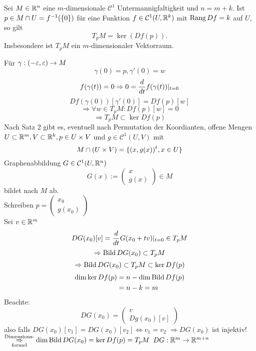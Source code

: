 \documentclass[../ana2.tex]{subfiles}
\begin{document}
\begin{lem}
    Sei \( M \in \mathbb{R}^n \) eine \(m\)-dimensionale 
    \( \mathcal{C}^1 \) Untermannigfaltigkeit  und \(n = m + k\).
    Ist \( p \in M \cap U = f^{-1}(\{0\}) \) für eine
    Funktion \( f \in \mathcal{C}^1(U, \mathbb{R}^k) \) mit 
    \( \operatorname{Rang} Df = k \) auf \(U\),
    so gilt 
    \[ T_p M = \ker(Df(p)). \]
    Insbesondere ist \( T_p M \) ein \(m\)-dimensionaler 
    Vektorraum.
\end{lem}
\begin{bew}
    Für \(\gamma:(-\varepsilon, \varepsilon)\rightarrow M\)
    \[ \gamma(0) = p, \gamma'(0) = w \]
    \[ f(\gamma(t)) = 0 \Rightarrow 0 = \frac{d}{dt}f(\gamma(t))\vert_{t=0} \]
    \[ Df(\gamma(0))[\gamma'(0)] = Df(p)[w] \]
    \[ \Rightarrow \forall w \in T_p M: Df(p)[w] = 0 \]
    \[ \Rightarrow T_pM \subset \ker Df(p) \]
    Nach Satz 2 gibt es, eventuell nach Permutation der Koordianten, offene Mengen
    \(U \subset \mathbb{R}^m, V \subset \mathbb{R}^k, p \in U \times V\) und
    \(g \in \mathcal{C}^1(U, V) \) mit
    \[ M \cap (U \times V) = \{(x, g(x))^t, x \in U\} \]
    Graphenabbildung \( G \in \mathcal{C}^1(U, \mathbb{R}^n) \)
    \[ G(x) := \begin{pmatrix}
        x \\ g(x) 
    \end{pmatrix} \in M \]
    bildet nach \(M\) ab.\\
    Schreiben \(p = \begin{pmatrix}
        x_0 \\
        g(x_0)
    \end{pmatrix} \)\\
    Sei \(v \in \mathbb{R}^m\)
    \[ DG(x_0)[v] = \frac{d}{dt} G(x_0+tv) \vert_{t=0} \in T_pM \]
    \[ \Rightarrow \operatorname{Bild} DG(x_0) \subset T_p M\]
    \[ \Rightarrow \operatorname{Bild} DG(x_0) \subset T_pM \subset \ker Df(p) \]
    \begin{align*}
        \dim \ker Df(p) &= n - \dim \operatorname{Bild} Df(p) \\
        &= n -k = m
    \end{align*}
    Beachte: 
    \[DG(x_0) = \begin{pmatrix}
        v \\
        D g(x_0)[v]
    \end{pmatrix}  \]
    also falls \( DG(x_0)[v_1] 
    = D G(x_0)[v_2] \Leftrightarrow v_1 = v_2 \)
    \(\Rightarrow D G(x_0) \) ist injektiv!
    \(\overset{\text{Dimensions-}}{\underset{\text{formel}}{\Rightarrow}} 
    \dim \operatorname{Bild} DG(x_0) = \ker Df(p) = T_pM\)
    \( DG:\mathbb{R}^m\rightarrow \mathbb{R}^{m+n} \)
\end{bew}
\end{document}
